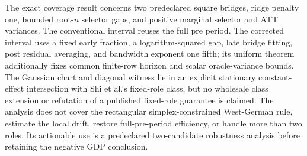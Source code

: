 \documentclass{article}
\begin{document}
The exact coverage result concerns two predeclared square bridges, ridge penalty one, bounded root-\(n\) selector gaps, and positive marginal selector and ATT variances. The conventional interval reuses the full pre period. The corrected interval uses a fixed early fraction, a logarithm-squared gap, late bridge fitting, post residual averaging, and bandwidth exponent one fifth; its uniform theorem additionally fixes common finite-row horizon and scalar oracle-variance bounds. The Gaussian chart and diagonal witness lie in an explicit stationary constant-effect intersection with Shi et al.'s fixed-role class, but no wholesale class extension or refutation of a published fixed-role guarantee is claimed. The analysis does not cover the rectangular simplex-constrained West-German rule, estimate the local drift, restore full-pre-period efficiency, or handle more than two roles. Its actionable use is a predeclared two-candidate robustness analysis before retaining the negative GDP conclusion.
\end{document}
